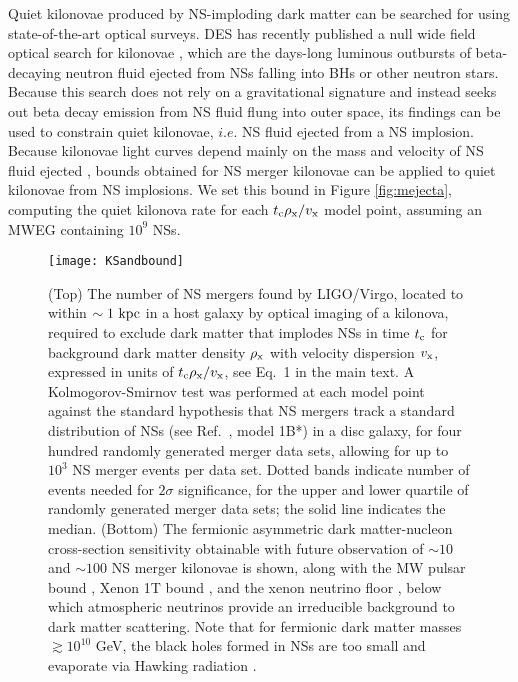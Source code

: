 \documentclass[nofootinbib,longbibliography,prd,floatfix,superscriptaddress,twocolumn]{revtex4-1}
\begin{document}
Quiet kilonovae produced by NS-imploding dark matter can be searched for using state-of-the-art optical surveys. DES has recently published a null wide field optical search for kilonovae \cite{Doctor:2016gdi}, which are the days-long luminous outbursts of beta-decaying neutron fluid ejected from NSs falling into BHs or other neutron stars. Because this search does not rely on a gravitational signature and instead seeks out beta decay emission from NS fluid flung into outer space, its findings can be used to constrain quiet kilonovae, $i.e.$ NS fluid ejected from a NS implosion. Because kilonovae light curves depend mainly on the mass and velocity of NS fluid ejected \cite{Kasen:2013xka}, bounds obtained for NS merger kilonovae can be applied to quiet kilonovae from NS implosions. We set this bound in Figure \ref{fig:mejecta}, computing the quiet kilonova rate for each $ t_{\rm c} \rho_{\rm x} / v_{\rm x}$ model point, assuming an MWEG containing $10^9$ NSs.

\begin{figure}[h!]
\texttt{[image: KSandbound]}
\caption{(Top) The number of NS mergers found by LIGO/Virgo, located to within $\sim 1 {~ \rm kpc}$ in a host galaxy by optical imaging of a kilonova, required to exclude dark matter that implodes NSs in time $t_{\rm c}$ for background dark matter density $\rho_{\rm x} $ with velocity dispersion $v_{\rm x}$, expressed in units of $t_{\rm c}  \rho_{\rm x} / v_{\rm x}$, see Eq.~1 in the main text. A Kolmogorov-Smirnov test was performed at each model point against the standard hypothesis that NS mergers track a standard distribution of NSs (see Ref.~\cite{2010A&A...510A..23S}, model 1B*) in a disc galaxy, for four hundred randomly generated merger data sets, allowing for up to $10^3$ NS merger events per data set. Dotted bands indicate number of events needed for $2 \sigma$ significance, for the upper and lower quartile of randomly generated merger data sets; the solid line indicates the median. 
(Bottom) The fermionic asymmetric dark matter-nucleon cross-section sensitivity obtainable with future observation of $\sim 10$ and $\sim 100$ NS merger kilonovae is shown, along with the MW pulsar bound \cite{Bramante:2015dfa}, Xenon 1T bound \cite{Aprile:2017iyp}, and the xenon neutrino floor \cite{Ruppin:2014bra}, below which atmospheric neutrinos provide an irreducible background to dark matter scattering. Note that for fermionic dark matter masses $\gtrsim 10^{10}$ GeV, the black holes formed in  NSs are too small and evaporate via Hawking radiation \cite{Bramante:2013hn}.}
\label{fig:loudonut}
\end{figure}
\end{document}
